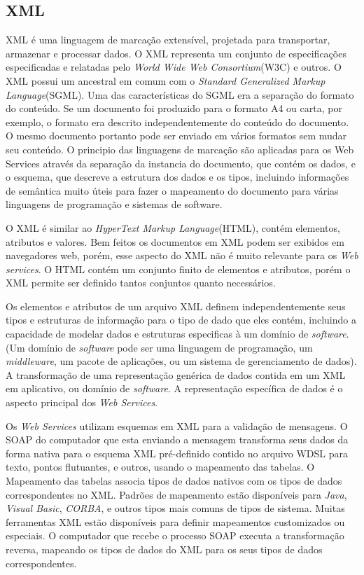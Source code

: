 \documentclass{acm_proc_article-sp}
\begin{document}
	\subsection{XML}
		XML é uma linguagem de marcação extensível, projetada para transportar, armazenar e processar dados. O XML representa um conjunto de especificações especificadas e relatadas pelo \emph{World Wide Web Consortium}(W3C) e outros. O XML possui um ancestral em comum com o \emph{Standard Generalized Markup Language}(SGML). Uma das características do SGML era a separação do formato do conteúdo. Se um documento foi produzido para o formato A4 ou carta, por exemplo, o formato era descrito independentemente do conteúdo do documento. O mesmo documento portanto pode ser enviado em vários formatos sem mudar seu conteúdo. O principio das linguagens de marcação são aplicadas para os Web Services através da separação da instancia do documento, que contém os dados, e o esquema, que descreve a estrutura dos dados e os tipos, incluindo informações de semântica muito úteis para fazer o mapeamento do documento para várias linguagens de programação e sistemas de software.
		
		O XML é similar ao \emph{HyperText Markup Language}(HTML), contém elementos, atributos e valores. Bem feitos os documentos em XML podem ser exibidos em navegadores web, porém, esse aspecto do XML não é muito relevante para os \emph{Web services}. O HTML contém um conjunto finito de elementos e atributos, porém o XML permite ser definido tantos conjuntos quanto necessários.
		
		Os elementos e atributos de um arquivo XML definem independentemente seus tipos e estruturas de informação para o tipo de dado que eles contém, incluindo a capacidade de modelar dados e estruturas especificas à um domínio de \emph{software}. (Um domínio de \emph{software} pode ser uma linguagem de programação, um \emph{middleware}, um pacote de aplicações, ou um sistema de gerenciamento de dados). A transformação de uma representação genérica de dados contida em um XML em aplicativo, ou domínio de \emph{software}. A representação específica de dados é o aspecto principal dos \emph{Web Services}.
		
		Os \emph{Web Services} utilizam esquemas em XML para a validação de mensagens. O SOAP do computador que esta enviando a mensagem transforma seus dados da forma nativa para o esquema XML pré-definido contido no arquivo WDSL para texto, pontos flutuantes, e outros, usando o mapeamento das tabelas. O Mapeamento das tabelas associa tipos de dados nativos com os tipos de dados correspondentes no XML. Padrões de mapeamento estão disponíveis para \emph{Java}, \emph{Visual Basic}, \emph{CORBA}, e outros tipos mais comuns de tipos de sistema. Muitas ferramentas XML estão disponíveis para definir mapeamentos customizados ou especiais. O computador que recebe o processo SOAP executa a transformação reversa, mapeando os tipos de dados do XML para os seus tipos de dados correspondentes.
		
\end{document}
